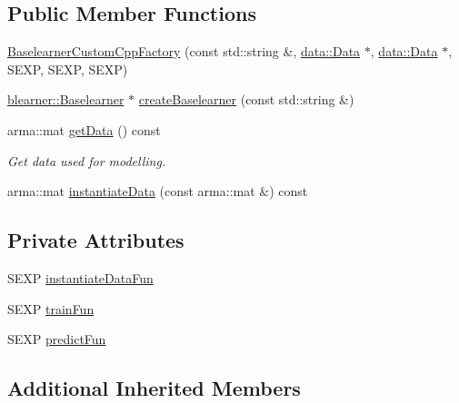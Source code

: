 \subsection*{Public Member Functions}
\begin{DoxyCompactItemize}
\item 
\hyperlink{classblearnerfactory_1_1_baselearner_custom_cpp_factory_aede05893f296f7cc4fa07b0601a426e8}{Baselearner\+Custom\+Cpp\+Factory} (const std\+::string \&, \hyperlink{classdata_1_1_data}{data\+::\+Data} $\ast$, \hyperlink{classdata_1_1_data}{data\+::\+Data} $\ast$, S\+E\+XP, S\+E\+XP, S\+E\+XP)
\item 
\hyperlink{classblearner_1_1_baselearner}{blearner\+::\+Baselearner} $\ast$ \hyperlink{classblearnerfactory_1_1_baselearner_custom_cpp_factory_a1754f789953cc9d12f7cdd861772d13b}{create\+Baselearner} (const std\+::string \&)
\item 
arma\+::mat \hyperlink{classblearnerfactory_1_1_baselearner_custom_cpp_factory_af11e8ca40f235632dba38ed3849f7606}{get\+Data} () const
\begin{DoxyCompactList}\small\item\em Get data used for modelling. \end{DoxyCompactList}\item 
arma\+::mat \hyperlink{classblearnerfactory_1_1_baselearner_custom_cpp_factory_a60d5992c6deec1c0489012a5257e868a}{instantiate\+Data} (const arma\+::mat \&) const
\end{DoxyCompactItemize}
\subsection*{Private Attributes}
\begin{DoxyCompactItemize}
\item 
S\+E\+XP \hyperlink{classblearnerfactory_1_1_baselearner_custom_cpp_factory_ac8e871bd70f1f560ed8fcab5556c97f0}{instantiate\+Data\+Fun}
\item 
S\+E\+XP \hyperlink{classblearnerfactory_1_1_baselearner_custom_cpp_factory_a8b36c04fdd1532ee53a1970f35641c05}{train\+Fun}
\item 
S\+E\+XP \hyperlink{classblearnerfactory_1_1_baselearner_custom_cpp_factory_a5238c8eedc4bfd58e9449b9a7e51c8aa}{predict\+Fun}
\end{DoxyCompactItemize}
\subsection*{Additional Inherited Members}


